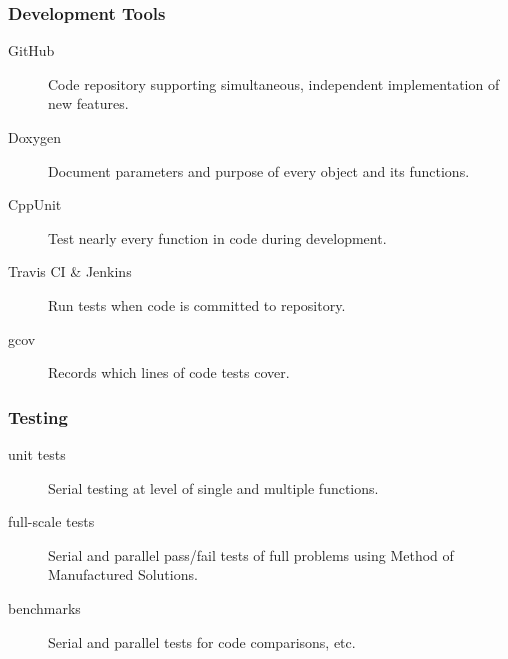 \documentclass[aspectratio=169,hyperref=colorlinks]{beamer}
\begin{document}
\begin{frame}
  \frametitle{Development Tools}

  \begin{description}
  \item[GitHub] Code repository supporting simultaneous, independent implementation of new features.
  \item[Doxygen] Document parameters and purpose of every object and its functions.
  \item[CppUnit] Test nearly every function in code during development.
  \item[Travis CI \& Jenkins] Run tests when code is committed to repository.
  \item[gcov] Records which lines of code tests cover.
  \end{description}

\end{frame}

\begin{frame}
  \frametitle{Testing}

  \begin{description}
  \item[unit tests] Serial testing at level of single and multiple functions.
  \item[full-scale tests] Serial and parallel pass/fail tests of full problems using Method of Manufactured Solutions.
  \item[benchmarks] Serial and parallel tests for code comparisons, etc.
  \end{description}

\end{frame}
\end{document}
